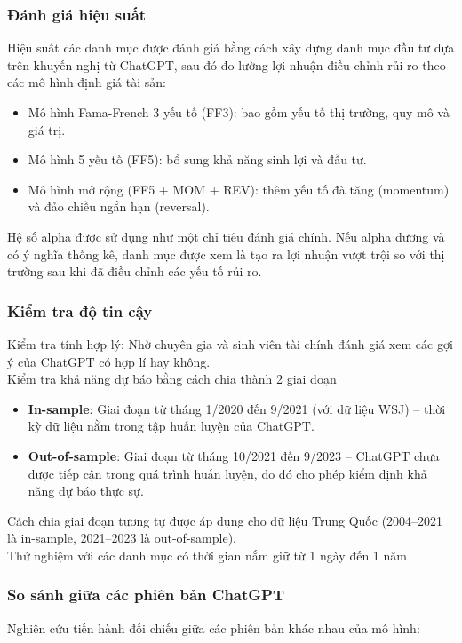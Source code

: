 \documentclass[a4paper,12pt]{article}
\begin{document}
\subsubsection{Đánh giá hiệu suất}
Hiệu suất các danh mục được đánh giá bằng cách xây dựng danh mục đầu tư dựa trên khuyến nghị từ ChatGPT, sau đó đo lường lợi nhuận điều chỉnh rủi ro theo các mô hình định giá tài sản:

\begin{itemize}
    \item Mô hình Fama-French 3 yếu tố (FF3): bao gồm yếu tố thị trường, quy mô và giá trị.
    \item Mô hình 5 yếu tố (FF5): bổ sung khả năng sinh lợi và đầu tư.
    \item Mô hình mở rộng (FF5 + MOM + REV): thêm yếu tố đà tăng (momentum) và đảo chiều ngắn hạn (reversal).
\end{itemize}

Hệ số alpha được sử dụng như một chỉ tiêu đánh giá chính. Nếu alpha dương và có ý nghĩa thống kê, danh mục được xem là tạo ra lợi nhuận vượt trội so với thị trường sau khi đã điều chỉnh các yếu tố rủi ro.

\subsubsection{Kiểm tra độ tin cậy}
Kiểm tra tính hợp lý: Nhờ chuyên gia và sinh viên tài chính đánh giá xem các gợi ý của ChatGPT có hợp lí hay không.
\\ Kiểm tra khả năng dự báo bằng cách chia thành 2 giai đoạn

\begin{itemize}
    \item \textbf{In-sample}: Giai đoạn từ tháng 1/2020 đến 9/2021 (với dữ liệu WSJ) – thời kỳ dữ liệu nằm trong tập huấn luyện của ChatGPT.
    \item \textbf{Out-of-sample}: Giai đoạn từ tháng 10/2021 đến 9/2023 – ChatGPT chưa được tiếp cận trong quá trình huấn luyện, do đó cho phép kiểm định khả năng dự báo thực sự.
\end{itemize}

Cách chia giai đoạn tương tự được áp dụng cho dữ liệu Trung Quốc (2004–2021 là in-sample, 2021–2023 là out-of-sample).
\\ Thử nghiệm với các danh mục có thời gian nắm giữ từ 1 ngày đến 1 năm


\subsubsection{So sánh giữa các phiên bản ChatGPT}
Nghiên cứu tiến hành đối chiếu giữa các phiên bản khác nhau của mô hình:
\end{document}
